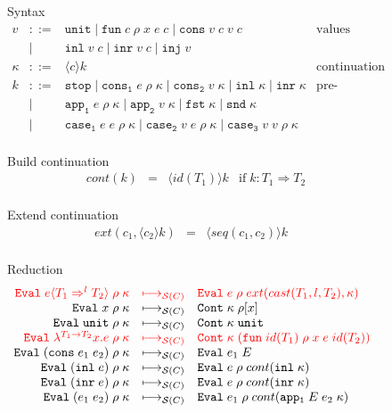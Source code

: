 \documentclass[acmsmall,review,anonymous]{acmart}\settopmatter{printfolios=true,printccs=false,printacmref=false}
\newcommand{\stxrule}[3]{#1 & ::= & #3 & \text{#2}\\}
\newcommand{\stxrulecont}[1]{& | & #1 & \\}
\newcommand{\funrule}[3]{#1 &=& #2 & #3\\}
\newcommand{\sOOinspect}[3]{\mathtt{Eval} \; #1 \; #2 \; #3}
\newcommand{\sOOreturn}[2]{\mathtt{Cont} \; #2 \; #1}
\newcommand{\sOOhalt}[1]{\mathtt{Halt} \; #1}
\newcommand{\eOOvar}[1]{#1}
\newcommand{\eOOsole}[0]{\mathtt{unit}}
\newcommand{\eOOlam}[4]{\lambda^{#1\rightarrow{}#2}#3.#4}
\newcommand{\eOOapp}[2]{#1 \; #2}
\newcommand{\eOOcons}[2]{\mathtt{cons} \; #1 \; #2}
\newcommand{\eOOinl}[1]{\mathtt{inl} \; #1}
\newcommand{\eOOinr}[1]{\mathtt{inr} \; #1}
\newcommand{\eOOcast}[4]{#1 \langle \cOOcast{#2}{#3}{#4} \rangle}
\newcommand{\cOOcast}[3]{#1 \Rightarrow^{#2} #3}
\newcommand{\rOOsucc}[1]{\mathtt{succ}\;#1}
\newcommand{\rOOfail}[1]{\mathtt{fail}\;#1}
\newcommand{\kOOinl}[1]{\mathtt{inl} \; #1}
\newcommand{\kOOinr}[1]{\mathtt{inr} \; #1}
\newcommand{\kOOappI}[3]{
	\mathtt{app_1} \; #1 \; #2 \; #3
}
\newcommand{\hcvOOinj}[2]{\mathtt{inj} \; #2}
\newcommand{\hcvOOfun}[5]{\mathtt{fun} \; #1 \; #2 \; #3 \; #4 \; #5}
\newcommand{\hcvOOtt}[0]{\mathtt{unit}}
\newcommand{\hcvOOcons}[4]{\mathtt{cons}\;#1\;#2\;#3\;#4}
\newcommand{\hcvOOinl}[2]{\mathtt{inl}\;#1\;#2}
\newcommand{\hcvOOinr}[2]{\mathtt{inr}\;#1\;#2}
\newcommand{\hckOOmt}[0]{\mathtt{stop}}
\newcommand{\sidecond}[1]{\text{if}\;#1}
\newcommand{\judgeSreduce}[3]{#2 \longmapsto_{\mathcal{S}(#1)} #3}
\newcommand{\redruleS}[3]{#1 & \longmapsto_{\mathcal{S}(C)} & #2 & #3\\}
\newcommand{\hiredruleS}[3]{\highlight{#1} & 
\highlight{\longmapsto_{\mathcal{S}(C)}} & \highlight{#2} & \highlight{#3} \\}
\newcommand{\highlight}[1]{{\color{red} #1}}
\begin{document}
\begin{figure}
	Syntax
	\[
	\begin{array}{rclr}
	
	\stxrule{v}{values}{
		\hcvOOtt \mid
		\hcvOOfun{c}{\rho}{x}{e}{c} \mid
		\hcvOOcons{v}{c}{v}{c}
	}
	\stxrulecont{
		\hcvOOinl{v}{c} \mid
		\hcvOOinr{v}{c} \mid
		\hcvOOinj{P}{v}
	}
	\stxrule{\kappa}{continuation}{
		\langle c \rangle k
	}
	\stxrule{k}{pre-continuations}{
		\hckOOmt \mid{}
		\mathtt{cons_1} \; e \; \rho \; \kappa \mid{}
		\mathtt{cons_2} \; v \; \kappa \mid{}
		\mathtt{inl} \; \kappa \mid{}
		\mathtt{inr} \; \kappa
	}
	\stxrulecont{
		\mathtt{app_1} \; e \; \rho \; \kappa \mid{}
		\mathtt{app_2} \; v \; \kappa \mid{}
		\mathtt{fst} \; \kappa \mid{}
		\mathtt{snd} \; \kappa
	}
	\stxrulecont{
		\mathtt{case_1} \; e \; e \; \rho \; \kappa \mid
		\mathtt{case_2} \; v \; e \; \rho \; \kappa \mid{}
		\mathtt{case_3} \; v \; v \; \rho \; \kappa
	}
	\end{array}
	\]
	
	Build continuation 
	\[
	\begin{array}{rclc}
	\funrule{cont(k)}{\langle id(T_1) \rangle k}{
		\sidecond{k : T_1 \Longrightarrow T_2}}
	\end{array}
	\]
	
	Extend continuation 
	\[
	\begin{array}{rclc}
	\funrule{ext(c_1,\langle c_2 \rangle k)}{\langle seq(c_1,c_2) \rangle k}{}
	\end{array}
	\]
	
	Reduction \fbox{$ \judgeSreduce{C}{s}{s} $}
	\[
	\begin{array}{rclr}
	\hiredruleS{
		\sOOinspect{\eOOcast{e}{T_1}{l}{T_2}}{\rho}{\kappa}
	}{
		\sOOinspect{e}{\rho}{ext(cast(T_1,l,T_2),\kappa)}
	}{}
	\redruleS{
		\sOOinspect{\eOOvar{x}}{\rho}{\kappa}
	}{	
		\sOOreturn{\rho[x]}{\kappa}
	}{}
	\redruleS{
		\sOOinspect{\eOOsole}{\rho}{\kappa}
	}{
		\sOOreturn{\hcvOOtt}{\kappa}
	}{}
	\hiredruleS{
		\sOOinspect{\eOOlam{T_1}{T_2}{x}{e}}{\rho}{\kappa}
	}{
		\sOOreturn{(\hcvOOfun{id(T_1)}{\rho}{x}{e}{id(T_2)})}{\kappa}
	}{}
	\redruleS{
		\sOOinspect{(\eOOcons{e_1}{e_2})}{\rho}{\kappa}
	}{
		\sOOinspect{e_1}{E}{}
	}{}
	\redruleS{
		\sOOinspect{(\eOOinl{e})}{\rho}{\kappa}
	}{
		\sOOinspect{e}{\rho}{cont(\kOOinl{\kappa})}
	}{}
	\redruleS{
		\sOOinspect{(\eOOinr{e})}{\rho}{\kappa}
	}{
		\sOOinspect{e}{\rho}{cont(\kOOinr{\kappa})}
	}{}
	\redruleS{
		\sOOinspect{(\eOOapp{e_1}{e_2})}{\rho}{\kappa}
	}{
		\sOOinspect{e_1}{\rho}{cont(\kOOappI{E}{e_2}{\kappa})}}{}
	

\end{array}\]
\end{figure}
\end{document}

